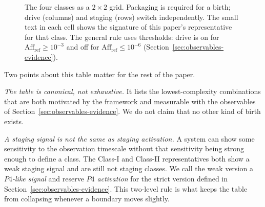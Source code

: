 \begin{figure}[tbp]
\centering
{}
\caption{The four classes as a $2\times 2$ grid. Packaging is required for a birth; drive (columns) and staging (rows) switch independently. The small text in each cell shows the signature of this paper's representative for that class. The general rule uses thresholds: drive is on for $\mathrm{Aff}_{\mathrm{ref}}\ge10^{-3}$ and off for $\mathrm{Aff}_{\mathrm{ref}}\le10^{-6}$ (Section~\ref{sec:observables-evidence}).}
\label{fig:taxonomy}
\end{figure}

Two points about this table matter for the rest of the paper.

\emph{The table is canonical, not exhaustive.} It lists the lowest-complexity combinations that are both motivated by the framework and measurable with the observables of Section~\ref{sec:observables-evidence}. We do not claim that no other kind of birth exists.

\emph{A staging signal is not the same as staging activation.} A system can show some sensitivity to the observation timescale without that sensitivity being strong enough to define a class. The Class-I and Class-II representatives both show a weak staging signal and are still not staging classes. We call the weak version a \emph{$P4$-like signal} and reserve \emph{$P4$ activation} for the strict version defined in Section~\ref{sec:observables-evidence}. This two-level rule is what keeps the table from collapsing whenever a boundary moves slightly.
